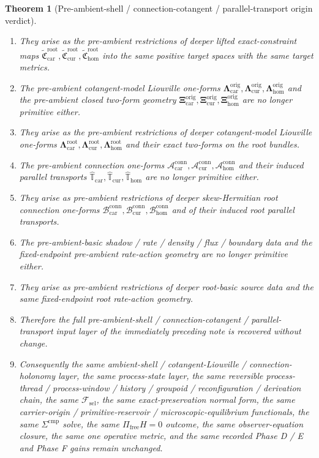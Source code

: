 \documentclass[11pt]{article}
\newcommand{\StemFunctional}{\mathscr F_{\mathrm{sel}}}
\newcommand{\TensorOriginLiouville}{\boldsymbol{\Lambda}_{\mathrm{car}}^{\mathrm{orig}}}
\newcommand{\CurOriginLiouville}{\boldsymbol{\Lambda}_{\mathrm{cur}}^{\mathrm{orig}}}
\newcommand{\HomOriginLiouville}{\boldsymbol{\Lambda}_{\mathrm{hom}}^{\mathrm{orig}}}
\newcommand{\TensorOriginTwo}{\boldsymbol{\Xi}_{\mathrm{car}}^{\mathrm{orig}}}
\newcommand{\CurOriginTwo}{\boldsymbol{\Xi}_{\mathrm{cur}}^{\mathrm{orig}}}
\newcommand{\HomOriginTwo}{\boldsymbol{\Xi}_{\mathrm{hom}}^{\mathrm{orig}}}
\newcommand{\TensorConnectionForm}{\mathcal A_{\mathrm{car}}^{\mathrm{conn}}}
\newcommand{\CurConnectionForm}{\mathcal A_{\mathrm{cur}}^{\mathrm{conn}}}
\newcommand{\HomConnectionForm}{\mathcal A_{\mathrm{hom}}^{\mathrm{conn}}}
\newcommand{\TensorOriginTransport}{\widehat{\mathbb T}_{\mathrm{car}}}
\newcommand{\CurOriginTransport}{\widehat{\mathbb T}_{\mathrm{cur}}}
\newcommand{\HomOriginTransport}{\widehat{\mathbb T}_{\mathrm{hom}}}
\newcommand{\TensorRootConstraintMap}{\widetilde{\mathfrak C}_{\mathrm{car}}^{\mathrm{root}}}
\newcommand{\CurRootConstraintMap}{\widetilde{\mathfrak C}_{\mathrm{cur}}^{\mathrm{root}}}
\newcommand{\HomRootConstraintMap}{\widetilde{\mathfrak C}_{\mathrm{hom}}^{\mathrm{root}}}
\newcommand{\TensorRootLiouville}{\boldsymbol{\Lambda}_{\mathrm{car}}^{\mathrm{root}}}
\newcommand{\CurRootLiouville}{\boldsymbol{\Lambda}_{\mathrm{cur}}^{\mathrm{root}}}
\newcommand{\HomRootLiouville}{\boldsymbol{\Lambda}_{\mathrm{hom}}^{\mathrm{root}}}
\newcommand{\TensorRootConnectionForm}{\mathcal B_{\mathrm{car}}^{\mathrm{conn}}}
\newcommand{\CurRootConnectionForm}{\mathcal B_{\mathrm{cur}}^{\mathrm{conn}}}
\newcommand{\HomRootConnectionForm}{\mathcal B_{\mathrm{hom}}^{\mathrm{conn}}}
\newtheorem{theorem}{Theorem}
\begin{document}
\begin{theorem}[Pre-ambient-shell / connection-cotangent / parallel-transport origin verdict]
\begin{enumerate}
    \item They arise as the pre-ambient restrictions of deeper lifted exact-constraint maps \(\TensorRootConstraintMap,\CurRootConstraintMap,\HomRootConstraintMap\) into the same positive target spaces with the same target metrics.
    \item The pre-ambient cotangent-model Liouville one-forms \(\TensorOriginLiouville,\CurOriginLiouville,\HomOriginLiouville\) and the pre-ambient closed two-form geometry \(\TensorOriginTwo,\CurOriginTwo,\HomOriginTwo\) are no longer primitive either.
    \item They arise as the pre-ambient restrictions of deeper cotangent-model Liouville one-forms \(\TensorRootLiouville,\CurRootLiouville,\HomRootLiouville\) and their exact two-forms on the root bundles.
    \item The pre-ambient connection one-forms \(\TensorConnectionForm,\CurConnectionForm,\HomConnectionForm\) and their induced parallel transports \(\TensorOriginTransport,\CurOriginTransport,\HomOriginTransport\) are no longer primitive either.
    \item They arise as pre-ambient restrictions of deeper skew-Hermitian root connection one-forms \(\TensorRootConnectionForm,\CurRootConnectionForm,\HomRootConnectionForm\) and of their induced root parallel transports.
    \item The pre-ambient-basic shadow / rate / density / flux / boundary data and the fixed-endpoint pre-ambient rate-action geometry are no longer primitive either.
    \item They arise as pre-ambient restrictions of deeper root-basic source data and the same fixed-endpoint root rate-action geometry.
    \item Therefore the full pre-ambient-shell / connection-cotangent / parallel-transport input layer of the immediately preceding note is recovered without change.
    \item Consequently the same ambient-shell / cotangent-Liouville / connection-holonomy layer, the same process-state layer, the same reversible process-thread / process-window / history / groupoid / reconfiguration / derivation chain, the same \(\StemFunctional\), the same exact-preservation normal form, the same carrier-origin / primitive-reservoir / microscopic-equilibrium functionals, the same \(\Sigma^{\mathrm{cmp}}\) solve, the same \(\Pi_{\mathrm{free}}H=0\) outcome, the same observer-equation closure, the same one operative metric, and the same recorded Phase D / E and Phase F gains remain unchanged.

\end{enumerate}
\end{theorem}
\end{document}
